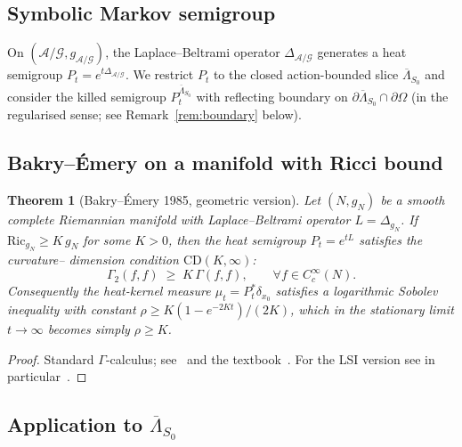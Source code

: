 \documentclass[11pt,a4paper]{amsart}
\newtheorem{theorem}{Theorem}[section]
\theoremstyle{definition}
\newcommand{\Ric}{\mathrm{Ric}}
\begin{document}
\subsection{Symbolic Markov semigroup}
On $(\mathcal A/\mathcal G, g_{\mathcal A/\mathcal G})$, the Laplace--Beltrami
operator $\Delta_{\mathcal A/\mathcal G}$ generates a heat semigroup
$P_t = e^{t\Delta_{\mathcal A/\mathcal G}}$. We restrict $P_t$ to the
closed action-bounded slice $\overline\Lambda_{S_0}$ and consider the
killed semigroup $P_t^{\overline\Lambda_{S_0}}$ with reflecting boundary
on $\partial\overline\Lambda_{S_0}\cap\partial\Omega$
(in the regularised sense; see Remark~\ref{rem:boundary} below).

\subsection{Bakry--\'Emery on a manifold with Ricci bound}

\begin{theorem}[Bakry--\'Emery 1985, geometric version]\label{thm:BE}
Let $(N, g_N)$ be a smooth complete Riemannian manifold with Laplace--Beltrami
operator $L = \Delta_{g_N}$. If $\Ric_{g_N} \geq K\, g_N$ for some
$K > 0$, then the heat semigroup $P_t = e^{tL}$ satisfies the curvature--
dimension condition $\mathrm{CD}(K, \infty)$:
$$
\Gamma_2(f,f) \;\geq\; K\,\Gamma(f,f), \qquad \forall f \in C_c^\infty(N).
$$
Consequently the heat-kernel measure $\mu_t = P_t^*\delta_{x_0}$ satisfies a
logarithmic Sobolev inequality with constant $\rho \geq K(1 - e^{-2Kt})/(2K)$,
which in the stationary limit $t\to\infty$ becomes simply $\rho \geq K$.
\end{theorem}
\begin{proof}
Standard $\Gamma$-calculus; see~\cite{BakryEmery1985} and
the textbook~\cite{BakryGentilLedoux2014}. For the LSI version see in
particular~\cite[Thm.~4.7.2]{BakryGentilLedoux2014}.
\end{proof}

\subsection{Application to $\overline\Lambda_{S_0}$}
\end{document}
